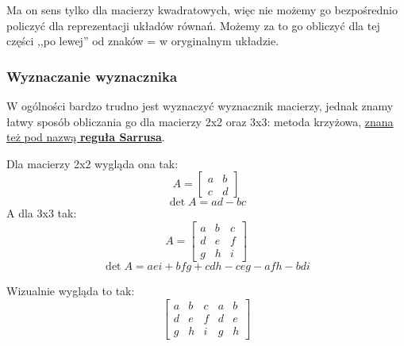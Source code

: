 \documentclass{article}
\theoremstyle{remark}
\begin{document}
Ma on sens tylko dla macierzy kwadratowych, więc nie możemy go bezpośrednio policzyć
dla reprezentacji układów równań. Możemy za to go obliczyć dla tej części ,,po lewej''
od znaków = w oryginalnym układzie.

\subsubsection{Wyznaczanie wyznacznika}
W ogólności bardzo trudno jest wyznaczyć wyznacznik macierzy, jednak znamy łatwy
sposób obliczania go dla macierzy 2x2 oraz 3x3: metoda krzyżowa,
\ul{znana też pod nazwą }\textbf{\ul{reguła Sarrusa}}.

Dla macierzy 2x2 wygląda ona tak:
\[A=\left[
  \begin{array}{ll}
    a&b\\
    c&d
  \end{array}
\right]\]\[ \det A=ad-bc \]
A dla 3x3 tak:
\[A=\left[
  \begin{array}{lll}
    a&b&c\\
    d&e&f\\
    g&h&i
  \end{array}
\right]\]\[ \det A=aei+bfg+cdh-ceg-afh-bdi\]

Wizualnie wygląda to tak:
\[\left[
  \begin{array}{lll|ll}
    a&b&c&a&b\\
    d&e&f&d&e\\
    g&h&i&g&h 
  \end{array}
\right]\]
\newcommand\checkers[1]{%
 \draw [BarreStyle=red] (#1-1-1.120) node[SignePlus=red] {$+$} to (#1-3-3.320) ;
 \draw [BarreStyle=red] (#1-1-2.120) node[SignePlus=red] {$+$} to (#1-3-4.320) ;
 \draw [BarreStyle=red] (#1-1-3.120) node[SignePlus=red] {$+$} to (#1-3-5.320) ;
 \draw [BarreStyle=blue]  (#1-1-3.35) node[SigneMoins=blue] {$-$} to (#1-3-1.230);
 \draw [BarreStyle=blue]  (#1-1-4.35) node[SigneMoins=blue] {$-$} to (#1-3-2.230);
 \draw [BarreStyle=blue]  (#1-1-5.35) node[SigneMoins=blue] {$-$} to (#1-3-3.230);
 \draw let \p1 = (#1-3-3.south east), \p2 = ( $ (#1-1-3.north east)!.5!(#1-1-4.north) $ ) in (\p2) -- (\x2,\y1);
 \draw let \p1 = (#1-1-1.north west), \p2 = (#1-3-1.south west) in (\p2) -- (\x2,\y1);
}
\begin{figure}[H]
  \centering
    \\[1em]
\end{figure}
\end{document}
